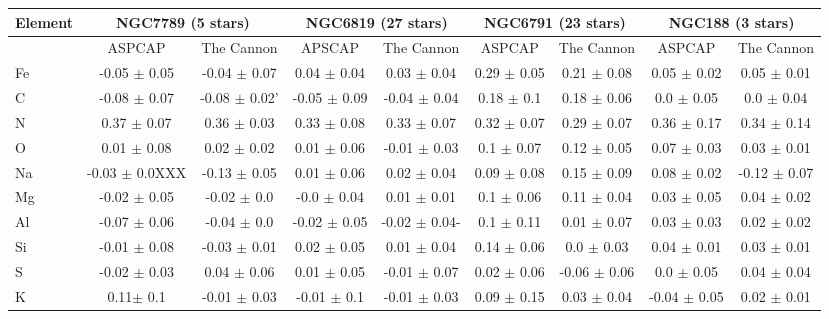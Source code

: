 \documentclass[14pt, preprint2]{aastex6}
\begin{document}
\begin{table}[h]
\centering
\tiny
\begin{tabular}{ | p{} | c| c | c | c | c | c | c | c | }
\hline
\multicolumn{1}{|c|}{Element}& \multicolumn{2}{|c|}{NGC7789 (5 stars)} & \multicolumn{2}{|c|}{NGC6819 (27 stars)}  & \multicolumn{2}{|c|}{NGC6791 (23 stars)} & \multicolumn{2}{|c|}{ NGC188 (3 stars)} \\
\hline
 &  ASPCAP & The Cannon & APSCAP & The Cannon & ASPCAP & The Cannon & ASPCAP & The Cannon \\
 \hline
Fe &  -0.05 $\pm$ 0.05  & -0.04 $\pm$ 0.07 &  0.04 $\pm$ 0.04   & 0.03 $\pm$ 0.04  &  0.29 $\pm$ 0.05  & 0.21 $\pm$ 0.08 &   0.05 $\pm$ 0.02 & 0.05 $\pm$ 0.01   \\
C & -0.08 $\pm$ 0.07  & -0.08 $\pm$ 0.02' & -0.05 $\pm$ 0.09 & -0.04 $\pm$ 0.04 & 0.18 $\pm$ 0.1 &0.18 $\pm$ 0.06 & 0.0 $\pm$ 0.05 & 0.0 $\pm$ 0.04 \\
N &  0.37 $\pm$ 0.07 & 0.36 $\pm$ 0.03 & 0.33 $\pm$ 0.08 & 0.33 $\pm$ 0.07 & 0.32 $\pm$ 0.07 & 0.29 $\pm$ 0.07 &  0.36 $\pm$ 0.17 & 0.34 $\pm$ 0.14 \\
O & 0.01 $\pm$ 0.08 & 0.02 $\pm$ 0.02 &  0.01 $\pm$ 0.06  & -0.01 $\pm$ 0.03 & 0.1 $\pm$ 0.07 & 0.12 $\pm$ 0.05 & 0.07 $\pm$ 0.03  & 0.03 $\pm$ 0.01 \\
Na & -0.03 $\pm$ 0.0XXX & -0.13 $\pm$ 0.05 &  0.01 $\pm$ 0.06  & 0.02 $\pm$ 0.04 & 0.09 $\pm$ 0.08 & 0.15 $\pm$ 0.09 &  0.08 $\pm$ 0.02 & -0.12 $\pm$ 0.07 \\
Mg  & -0.02 $\pm$ 0.05 & -0.02 $\pm$ 0.0 &   -0.0 $\pm$ 0.04 & 0.01 $\pm$ 0.01 & 0.1 $\pm$ 0.06 & 0.11 $\pm$ 0.04 &  0.03 $\pm$ 0.05 & 0.04 $\pm$ 0.02 \\
Al  & -0.07 $\pm$ 0.06 & -0.04 $\pm$ 0.0  & -0.02 $\pm$ 0.05 & -0.02 $\pm$ 0.04- & 0.1 $\pm$ 0.11  & 0.01 $\pm$ 0.07 & 0.03 $\pm$ 0.03  & 0.02 $\pm$ 0.02 \\
Si & -0.01 $\pm$ 0.08 & -0.03 $\pm$ 0.01 &  0.02 $\pm$ 0.05 & 0.01 $\pm$ 0.04 & 0.14 $\pm$ 0.06  & 0.0 $\pm$ 0.03 & 0.04 $\pm$ 0.01  & 0.03 $\pm$ 0.01  \\
S & -0.02 $\pm$ 0.03 &  0.04 $\pm$ 0.06 &  0.01 $\pm$ 0.05 & -0.01 $\pm$ 0.07  & 0.02 $\pm$ 0.06 & -0.06 $\pm$ 0.06 & 0.0 $\pm$ 0.05   &  0.04 $\pm$ 0.04 \\
K & 0.11$\pm$ 0.1 & -0.01 $\pm$ 0.03 & -0.01 $\pm$ 0.1 & -0.01 $\pm$ 0.03 &  0.09 $\pm$ 0.15  & 0.03 $\pm$ 0.04 & -0.04 $\pm$ 0.05  & 0.02 $\pm$ 0.01  \\

\end{tabular}
\end{table}
\end{document}
